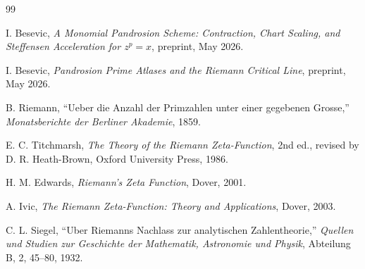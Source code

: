 \documentclass[11pt]{article}
\begin{document}
\begin{thebibliography}{99}

I. Besevic, \emph{A Monomial Pandrosion Scheme: Contraction, Chart Scaling,
and Steffensen Acceleration for \(z^p=x\)}, preprint, May 2026.

I. Besevic, \emph{Pandrosion Prime Atlases and the Riemann Critical Line},
preprint, May 2026.

B. Riemann, ``Ueber die Anzahl der Primzahlen unter einer gegebenen
Grosse,'' \emph{Monatsberichte der Berliner Akademie}, 1859.

E. C. Titchmarsh, \emph{The Theory of the Riemann Zeta-Function}, 2nd ed.,
revised by D. R. Heath-Brown, Oxford University Press, 1986.

H. M. Edwards, \emph{Riemann's Zeta Function}, Dover, 2001.

A. Ivic, \emph{The Riemann Zeta-Function: Theory and Applications}, Dover,
2003.

C. L. Siegel, ``Uber Riemanns Nachlass zur analytischen Zahlentheorie,''
\emph{Quellen und Studien zur Geschichte der Mathematik, Astronomie und
Physik}, Abteilung B, 2, 45--80, 1932.

\end{thebibliography}
\end{document}
